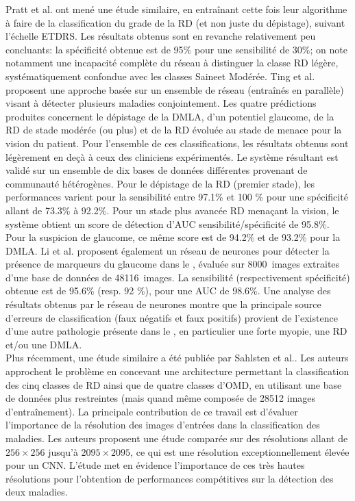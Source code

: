 Pratt et al.\cite{prattConvolutionalNeuralNetworks2016} ont mené une étude similaire, en entraînant cette fois leur algorithme à faire de la classification du grade de la \ac{RD} (et non juste du dépistage), suivant l'échelle \ac{ETDRS}. Les résultats obtenus sont en revanche relativement peu concluants: la spécificité obtenue est de 95\% pour une sensibilité de 30\%; on note notamment une incapacité complète du réseau à distinguer la classe \og \ac{RD} légère\fg, systématiquement confondue avec les classes \og Saine\fg et \og Modérée\fg. 
Ting et al.\cite{tingDevelopmentValidationDeep2017} proposent une approche basée sur un ensemble de réseau (entraînés en parallèle) visant à détecter plusieurs maladies conjointement. Les quatre prédictions produites concernent le dépistage de la \ac{DMLA}, d'un potentiel glaucome, de la \ac{RD} de stade modérée (ou plus) et de la \ac{RD} évoluée au stade de menace pour la vision du patient. Pour l'ensemble de ces classifications, les résultats obtenus sont légèrement en deçà à ceux des cliniciens expérimentés. Le système résultant est validé sur un ensemble de dix bases de données différentes provenant de communauté hétérogènes. Pour le dépistage de la \ac{RD} (premier  stade), les performances varient pour la sensibilité entre 97.1\% et 100 \% pour une spécificité allant de 73.3\% à 92.2\%. Pour un stade plus avancée \ac{RD} menaçant la vision, le système obtient un score de détection d'\ac{AUC} sensibilité/spécificité de 95.8\%. Pour la suspicion de glaucome, ce même score est de 94.2\% et de 93.2\% pour la \ac{DMLA}. 
Li et al.\cite{liEfficacyDeepLearning2018} proposent également un réseau de neurones pour détecter la présence de marqueurs du glaucome dans le \fundus{}, évaluée sur \SI{8000}{images} extraites d'une base de données de \SI{48116}{images}. La sensibilité (respectivement spécificité) obtenue est de 95.6\% (resp. 92 \%), pour une \ac{AUC} de 98.6\%. Une analyse des résultats obtenus par le réseau de neurones montre que la principale source d'erreurs de classification (faux négatifs et faux positifs) provient de l'existence d'une autre pathologie présente dans le \fundus{}, en particulier une forte myopie, une \ac{RD} et/ou une \ac{DMLA}. \\
Plus récemment, une étude similaire a été publiée par Sahlsten et al.\cite{sahlstenDeepLearningFundus2019}. Les auteurs approchent le problème en concevant une architecture permettant la classification des cinq classes de \ac{RD} ainsi que de quatre classes d'\ac{OMD}, en utilisant une base de données plus restreintes (mais quand même composée de 28512 images d'entraînement). La principale contribution de ce travail est d'évaluer l'importance de la résolution des images d'entrées dans la classification des maladies. Les auteurs proposent une étude comparée sur des résolutions allant de $256 \times 256$ jusqu'à $2095 \times 2095$, ce qui est une résolution exceptionnellement élevée pour un \ac{CNN}. L'étude met en évidence l'importance de ces très hautes résolutions pour l'obtention de performances compétitives sur la détection des deux maladies.
